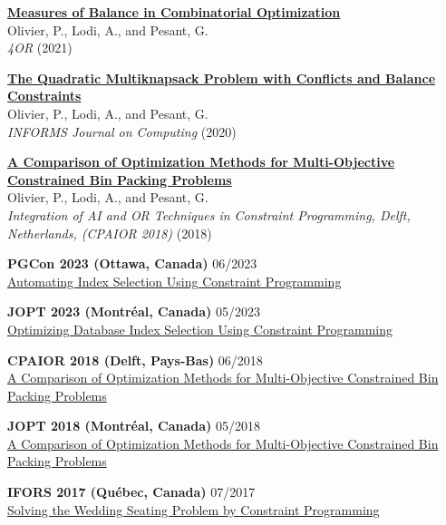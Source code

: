 \documentclass{memoir}
\begin{document}
\begin{list}{}
  \Item \href{https://doi.org/10.1007/s10288-021-00486-x}{\textbf{Measures of Balance in Combinatorial Optimization}} \\
  Olivier, P., Lodi, A., and Pesant, G. \\
  \emph{4OR} (2021)

  \Item \href{https://doi.org/10.1287/ijoc.2020.0983}{\textbf{The Quadratic Multiknapsack Problem with Conflicts and Balance Constraints}} \\
  Olivier, P., Lodi, A., and Pesant, G. \\
  \emph{INFORMS Journal on Computing} (2020)

  \Item \href{https://doi.org/10.1007/978-3-319-93031-2_33}{\textbf{A Comparison of Optimization Methods for Multi-Objective Constrained Bin Packing Problems}} \\
  Olivier, P., Lodi, A., and Pesant, G. \\
  \emph{Integration of AI and OR Techniques in Constraint Programming, Delft, Netherlands, (CPAIOR 2018)} (2018)

  \pagebreak %

  \Item \textbf{PGCon 2023 (Ottawa, Canada)} \hfill 06/2023 \\
  \href{https://www.pgcon.org/events/pgcon_2023/schedule/session/422-automating-index-selection-using-constraint-programming/}{Automating Index Selection Using Constraint Programming}

  \Item \textbf{JOPT 2023 (Montréal, Canada)} \hfill 05/2023 \\
  \href{https://symposia.cirrelt.ca/CORS-JOPT/fr/schedule?slot_id=2207}{Optimizing Database Index Selection Using Constraint Programming}
  
  \Item \textbf{CPAIOR 2018 (Delft, Pays-Bas)} \hfill 06/2018 \\
  \href{http://icaps18.icaps-conference.org/schedule}{A Comparison of Optimization Methods for Multi-Objective Constrained Bin Packing Problems}

  \Item \textbf{JOPT 2018 (Montréal, Canada)} \hfill 05/2018 \\
  \href{https://symposia.gerad.ca/jopt2018/en/schedule?slot_id=1374}{A Comparison of Optimization Methods for Multi-Objective Constrained Bin Packing Problems}

  \Item \textbf{IFORS 2017 (Québec, Canada)} \hfill 07/2017 \\
  \href{https://www.euro-online.org/conf/ifors2017/treat_abstract?paperid=1523}{Solving the Wedding Seating Problem by Constraint Programming}


\end{list}
\end{document}
